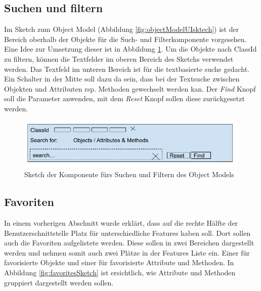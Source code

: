\subsection{Suchen und filtern}\label{searchandfilterUiSktech}
Im Sketch zum Object Model (Abbildung \ref{fig:objectModelUIsktech}) ist der Bereich oberhalb der Objekte für die Such- und Filterkomponente vorgesehen.
Eine Idee zur Umsetzung dieser ist in Abbildung \ref{fig:searchFilterSketch}.
Um die Objekte nach ClassId zu filtern, können die Textfelder im oberen Bereich des Sketchs verwendet werden.
Das Textfeld im unteren Bereich ist für die textbasierte suche gedacht.
Ein Schalter in der Mitte soll dazu da sein, dass bei der Textsuche zwischen Objekten und Attributen rsp. Methoden gewechselt werden kan.
Der \textit{Find} Knopf soll die Parameter anwenden, mit dem \textit{Reset} Knopf sollen diese zurückgesetzt werden.

\begin{figure}
   \centering
   \includegraphics[width=1.0\textwidth]{gfx/Search _ Filter sketch.png}
   \caption{
      Sketch der Komponente fürs Suchen und Filtern des Object Models
      }
      \label{fig:searchFilterSketch}
\end{figure}

\subsection{Favoriten}\label{uifavorites}
In einem vorherigen Abschnitt wurde erklärt, dass auf die rechte Hälfte der Benutzerschnittstelle Platz für unterschiedliche Features haben soll.
Dort sollen auch die Favoriten aufgelistete werden.
Diese sollen in zwei Bereichen dargestellt werden und nehmen somit auch zwei Plätze in der Features Liste ein.
Einer für favorisierte Objekte und einer für favorisierte Attribute und Methoden.
In Abbildung \ref{fig:favoritesSketch} ist ersichtlich, wie Attribute und Methoden gruppiert dargestellt werden sollen.

